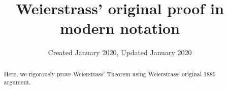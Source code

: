 \documentclass{article}
\title{Weierstrass' original proof in modern notation}
\author{}
\date{Created January 2020, Updated January 2020}
\begin{document}
\maketitle
\begin{abstract} 
Here, we rigorously prove Weierstrass' Theorem using Weierstrass' original 1885 argument. 
\end{abstract}

\end{document}
